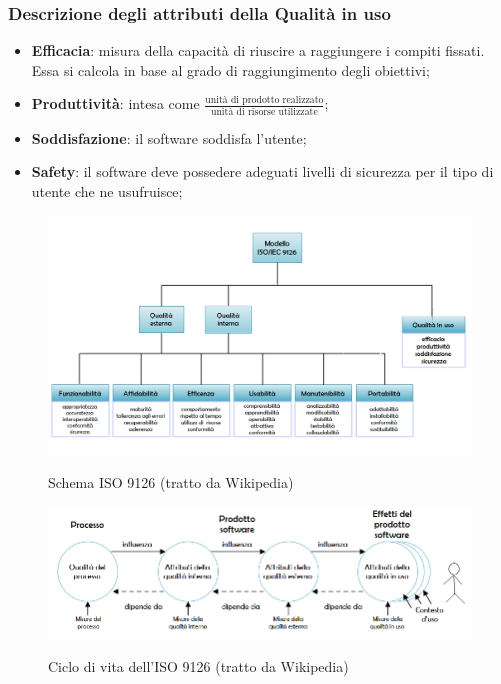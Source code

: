 		\subsubsection{Descrizione degli attributi della Qualità in uso}
		\begin{itemize}
			\item \textbf{Efficacia}: misura della capacità di riuscire a raggiungere i compiti fissati. Essa si calcola
			in base al grado di raggiungimento degli obiettivi;
			\item \textbf{Produttività}: intesa come $ \frac{\text{unità di prodotto realizzato}}{\text{unità di risorse utilizzate}} $;
			\item \textbf{Soddisfazione}: il software soddisfa l'utente;
			\item \textbf{Safety}: il software deve possedere adeguati livelli di sicurezza per il tipo di utente che ne usufruisce;
		\end{itemize}
	
	\begin{figure}[h]
		\includegraphics[width=\textwidth]{img/ISO9126.png}
		\label{fig:iso9126}
		\caption[Schema ISO 9126]{Schema ISO 9126 (tratto da Wikipedia)}
	\end{figure}

	
	
	\begin{figure}[h]
		\includegraphics[width=\textwidth]{img/Ciclo_di_vita_9126.png}
		\label{fig:ciclo_di_vita}
		\caption{Ciclo di vita dell'ISO 9126 (tratto da Wikipedia)}
	\end{figure}